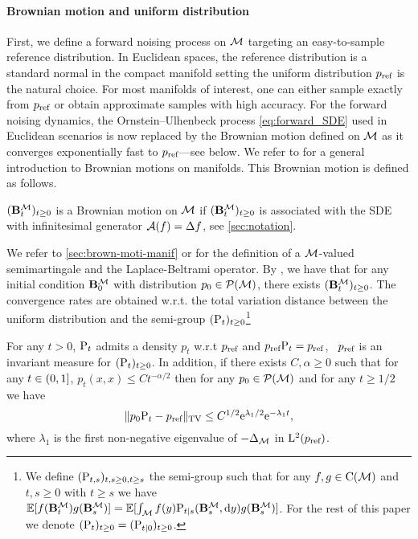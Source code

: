 \paragraph{Brownian motion and uniform distribution}

First, we define a forward noising process on $\mathcal M$ targeting an easy-to-sample
reference distribution. In Euclidean spaces, the reference distribution is a
standard normal in the compact manifold setting the uniform distribution
$p_{\textup{ref}}$ is the natural choice.  For most manifolds of interest, one can either
sample exactly from $p_{\textup{ref}}$ or obtain approximate samples with high accuracy.
For the forward noising dynamics, the Ornstein--Ulhenbeck process
\eqref{eq:forward_SDE} used in Euclidean scenarios is now replaced by the
Brownian motion defined on $\mathcal M$ as it converges exponentially fast to
$p_{\textup{ref}}$---see  below. We refer to
 for a general introduction to Brownian motions on
manifolds. This Brownian motion is defined as follows.

\begin{definition}
  $(\mathbf{B}^\mathcal M_t)_{t \geq 0}$ is a Brownian motion on $\mathcal M$ if
  $(\mathbf{B}^\mathcal M_t)_{t \geq 0}$ is associated with the SDE with infinitesimal
  generator $\mathcal{A}(f) = \Delta f$, see \cref{sec:notation}.
\end{definition}

We refer to \cref{sec:brown-moti-manif} or \citet[Chapter 1, Chapter
3]{hsu2002stochastic} for the definition of a $\mathcal M$-valued semimartingale and the
Laplace-Beltrami operator. By \citet[Proposition 3.2.1]{hsu2002stochastic}, we
have that for any initial condition $\mathbf{B}^\mathcal M_0$ with distribution
$p_0 \in \mathcal{P}(\mathcal M)$, there exists $(\mathbf{B}^\mathcal M_t)_{t \geq 0}$. The convergence
rates are obtained w.r.t. the total variation distance between the uniform
distribution and the semi-group $(\mathrm{P}_t)_{t \geq 0}$\footnote{We define
  $(\mathrm{P}_{t,s})_{t, s \geq 0, t \geq s}$ the semi-group such that for any
  $f,g \in \mathrm{C}(\mathcal M)$ and $t, s \geq 0$ with $t \geq s$ we have
  $\mathbb{E} [ f(\mathbf{B}_t^\mathcal M)g(\mathbf{B}_s^\mathcal M) ] = \mathbb{E} [ \int_{\mathcal M}f(y)
    \mathrm{P}_{t|s}(\mathbf{B}_s^\mathcal M, \mathrm{d} y) g(\mathbf{B}_s^\mathcal M) ]$. For the rest of this paper we
  denote $(\mathrm{P}_t)_{t \geq 0} = (\mathrm{P}_{t|0})_{t \geq 0}$.}

\begin{proposition}
  \label{prop:brownian_conv}
  For any $t > 0$, $\mathrm{P}_t$ admits a density $p_t$ w.r.t $p_{\textup{ref}}$ and
  $p_{\textup{ref}} \mathrm{P}_t = p_{\textup{ref}}$, \ie \ $p_{\textup{ref}}$ is an invariant measure for
  $(\mathrm{P}_t)_{t \geq 0}$. In addition, if there exists $C, \alpha \geq 0$ such
  that for any $t \in \left(0,1\right]$, $p_t(x,x) \leq C t^{-\alpha /2}$ then 
  for any $p_0 \in \mathcal{P}(\mathcal M)$ and for any $t \geq 1/2$ we have 
  \begin{equation}
    \textstyle{\| p_0\mathrm{P}_t - p_{\textup{ref}}\|_{\mathrm{TV}} \leq C^{1/2} \mathrm{e}^{\lambda_1 /2} \mathrm{e}^{-\lambda_1 t}  ,}
  \end{equation}
  where $\lambda_1$ is the first non-negative eigenvalue of $-\Delta_\mathcal M$  in $\mathrm{L}^2(p_{\textup{ref}})$.
\end{proposition}

